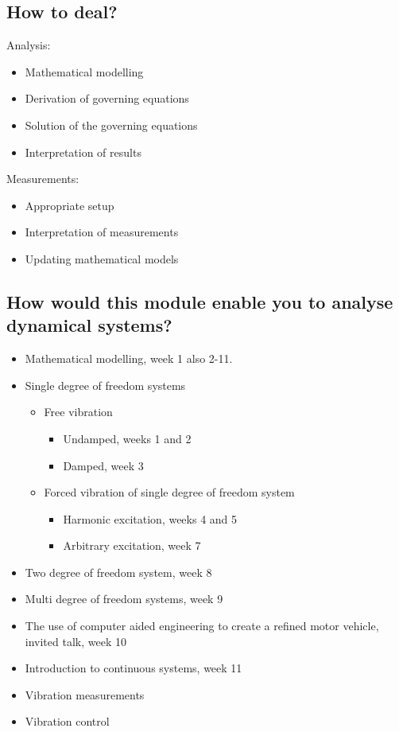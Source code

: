 \subsection{How to deal?}
Analysis:
\begin{itemize}
    \item Mathematical modelling
    \item Derivation of governing equations
    \item Solution of the governing equations
    \item Interpretation of results
\end{itemize}
Measurements:
\begin{itemize}
    \item Appropriate setup
    \item Interpretation of measurements
    \item Updating mathematical models
\end{itemize}
\subsection*{How would this module enable you to analyse dynamical systems?}
\begin{itemize}
    \item Mathematical modelling, week 1 also 2-11.
    \item Single degree of freedom systems
          \begin{itemize}
              \item Free vibration
                    \begin{itemize}
                        \item Undamped, weeks 1 and 2
                        \item Damped, week 3
                    \end{itemize}
              \item Forced vibration of single degree of freedom system
                    \begin{itemize}
                        \item Harmonic excitation, weeks 4 and 5
                        \item Arbitrary excitation, week 7
                    \end{itemize}
          \end{itemize}
    \item Two degree of freedom system, week 8
    \item Multi degree of freedom systems, week 9
    \item The use of computer aided engineering to create a refined motor vehicle, invited talk, week 10
    \item Introduction to continuous systems, week 11
    \item Vibration measurements
    \item Vibration control
\end{itemize}
